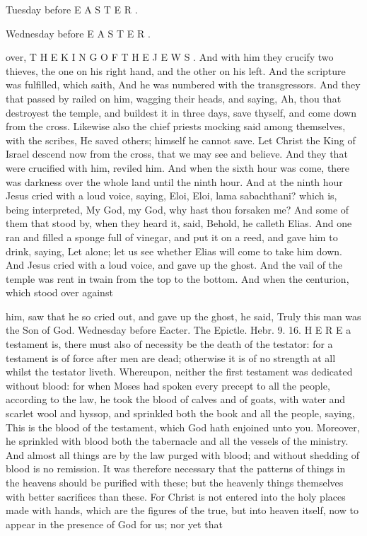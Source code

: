 Tuesday before E A S T E R .

Wednesday before E A S T E R .

over, T H E K I N G O F T H E J E W S . And with him they crucify two thieves, the one on his right hand, and the other on his left. And the scripture was fulfilled, which saith, And he was numbered with the transgressors. And they that passed by railed on him, wagging their heads, and saying, Ah, thou that destroyest the temple, and buildest it in three days, save thyself, and come down from the cross. Likewise also the chief priests mocking said among themselves, with the scribes, He saved others; himself he cannot save. Let Christ the King of Israel descend now from the cross, that we may see and believe. And they that were crucified with him, reviled him. And when the sixth hour was come, there was darkness over the whole land until the ninth hour. And at the ninth hour Jesus cried with a loud voice, saying, Eloi, Eloi, lama sabachthani? which is, being interpreted, My God, my God, why hast thou forsaken me? And some of them that stood by, when they heard it, said, Behold, he calleth Elias. And one ran and filled a sponge full of vinegar, and put it on a reed, and gave him to drink, saying, Let alone; let us see whether Elias will come to take him down. And Jesus cried with a loud voice, and gave up the ghost. And the vail of the temple was rent in twain from the top to the bottom. And when the centurion, which stood over against

him, saw that he so cried out, and gave up the ghost, he said, Truly this man was the Son of God. Wednesday before Eacter. The Epictle. Hebr. 9. 16. H E R E a testament is, there must also of necessity be the death of the testator: for a testament is of force after men are dead; otherwise it is of no strength at all whilst the testator liveth. Whereupon, neither the first testament was dedicated without blood: for when Moses had spoken every precept to all the people, according to the law, he took the blood of calves and of goats, with water and scarlet wool and hyssop, and sprinkled both the book and all the people, saying, This is the blood of the testament, which God hath enjoined unto you. Moreover, he sprinkled with blood both the tabernacle and all the vessels of the ministry. And almost all things are by the law purged with blood; and without shedding of blood is no remission. It was therefore necessary that the patterns of things in the heavens should be purified with these; but the heavenly things themselves with better sacrifices than these. For Christ is not entered into the holy places made with hands, which are the figures of the true, but into heaven itself, now to appear in the presence of God for us; nor yet that

